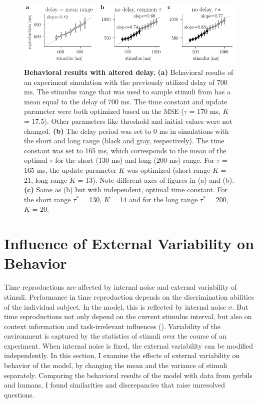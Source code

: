 \documentclass[10pt, a4paper]{article}
\begin{document}
\begin{figure}[ht]
	\centering
	\includegraphics{figures/delay.pdf}
	\caption{\textbf{Behavioral results with altered delay.} 
	\textbf{(a)} Behavioral results of an experiment simulation with the previously utilized delay of 700 ms. The stimulus range that was used to sample stimuli from has a mean equal to the delay of 700 ms. The time constant and update parameter were both optimized based on the MSE ($\tau$ = 170 ms, $K$ = 17.5). Other parameters like threshold and initial values were not changed. 
	\textbf{(b)} The delay period was set to 0 ms in simulations with the short and long range (black and gray, respectively). The time constant was set to 165 ms, which corresponds to the mean of the optimal $\tau$ for the short (130 ms) and long (200 ms) range. For $\tau$ = 165 ms, the update parameter $K$ was optimized (short range $K$ = 21, long range $K$ = 13). Note different axes of figures in (a) and (b).
	\textbf{(c)} Same as (b) but with independent, optimal time constant. For the short range $\tau^*$ = 130, $K$ = 14 and for the long range $\tau^*$ = 200, $K$ = 20.
	}
\label{fig:delay}
\end{figure}

\section{Influence of External Variability on Behavior} \label{externalvar}
Time reproductions are affected by internal noise and external variability of stimuli.
Performance in time reproduction depends on the discrimination abilities of the individual subject. In the model, this is reflected by internal noise $\sigma$.
But time reproductions not only depend on the current stimulus interval, but also on context information and task-irrelevant influences (\cite{Bausenhart2016}).
Variability of the environment is captured by the statistics of stimuli over the course of an experiment. 
When internal noise is fixed, the external variability can be modified independently. 
In this section, I examine the effects of external variability on behavior of the model, by changing the mean and the variance of stimuli separately. 
Comparing the behavioral results of the model with data from gerbils and humans, I found similarities and discrepancies that raise unresolved questions.
\end{document}
